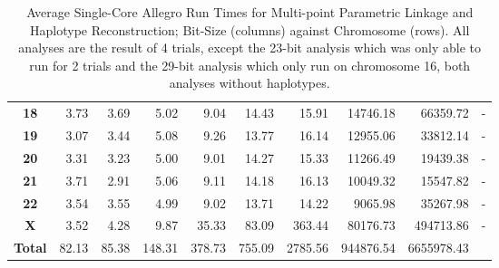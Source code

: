 \begin{table}[h]
\begin{center}
\begin{tabular}{crrrrrrrrr}
\textbf{18}                        & 3.73                           & 3.69                           & 5.02                           & 9.04                           & 14.43                           & 15.91                           & 14746.18                        & 66359.72                         & -                                \\
\textbf{19}                        & 3.07                           & 3.44                           & 5.08                           & 9.26                           & 13.77                           & 16.14                           & 12955.06                        & 33812.14                         & -                                \\
\textbf{20}                        & 3.31                           & 3.23                           & 5.00                           & 9.01                           & 14.27                           & 15.33                           & 11266.49                        & 19439.38                         & -                                \\
\textbf{21}                        & 3.71                           & 2.91                           & 5.06                           & 9.11                           & 14.18                           & 16.13                           & 10049.32                        & 15547.82                         & -                                \\
\textbf{22}                        & 3.54                           & 3.55                           & 4.99                           & 9.02                             & 13.71                           & 14.22                           & 9065.98                         & 35267.98                         & -                                \\
\textbf{X}                         & 3.52                           & 4.28                            & 9.87                           & 35.33                          & 83.09                           & 363.44                          & 80176.73                        & 494713.86                        & -                               \\\hline
\textbf{Total}	& 82.13		& 85.38		& 148.31		& 	378.73 & 	755.09 &  2785.56    & 944876.54 & 6655978.43 \\
\end{tabular}
\end{center}
\vspace{-15pt}
\caption[Average Single-Core Allegro Run Times for MPT and Haplotype Reconstruction]{Average Single-Core Allegro Run Times for Multi-point Parametric Linkage and Haplotype Reconstruction; Bit-Size (columns) against Chromosome (rows). All analyses are the result of 4 trials, except the 23-bit analysis which was only able to run for 2 trials and the 29-bit analysis which only run on chromosome 16, both analyses without haplotypes.}\label{table:res:allegrosinglechroms}
\end{table}



